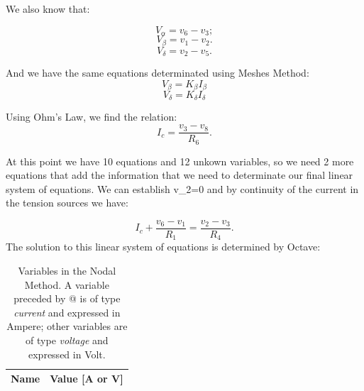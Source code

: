 We also know that:

\begin{equation}
  V_{\alpha}= v_6-v_3;
\end{equation}
\begin{equation}
  V_{\beta}= v_1-v_2.
\end{equation}
\begin{equation}
  V_{\delta}= v_2-v_5.
\end{equation}

And we have the same equations determinated using Meshes Method:
\begin{equation}
 V_{\beta}=K_{\beta}I_{\beta}
\end{equation}
\begin{equation}
 V_{\delta}=K_{\delta}I_{\delta}
\end{equation}

Using Ohm’s Law, we find the relation:
\begin{equation}
  I_c = \frac{v_3-v_8}{R_6}.
  \label{eq:NM_OhmIc}
\end{equation}

At this point we have 10 equations and 12 unkown variables, so we need 2 more equations that add the information that we need to determinate our final linear system of equations.
We can establish v_2=0 and by continuity of the current in the tension sources we have: 

\begin{equation}
  I_c + \frac{v_6-v_1}{R_1}= \frac{v_2-v_3}{R_4}.
\end{equation}
The solution to this linear system of equations is determined by Octave:

\begin{table}[h]
  \centering
  \begin{tabular}{|l|r|}
    \hline    
    {\bf Name} & {\bf Value [A or V]} \\ \hline
    
  \end{tabular}
  \caption{Variables in the Nodal Method. A variable preceded by @ is of type {\em current} and expressed in Ampere; other variables are of type {\em voltage} and expressed in Volt.}
  \label{tab:nos}
\end{table}

